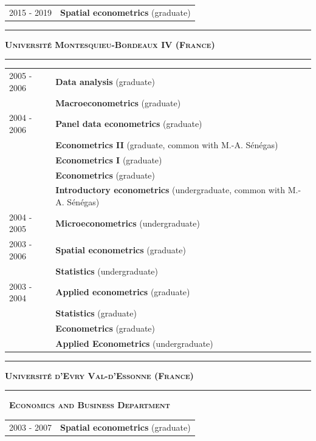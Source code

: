 \documentclass[a4paper,12pt]{article}
\newcommand{\titre}[1]{%
	\bigskip
	\noindent \rule[2mm]{\textwidth}{0.5pt}
	\textbf{\textsc{\large #1}} \\
	\noindent \rule[1mm]{\textwidth}{0.5pt}
	}
\newcommand{\smalltitre}[1]{%
	\noindent \textbullet~\textsc{\textbf{#1}}
	\smallskip
	}
\begin{document}
\noindent \begin{longtable}{@{}p{\annee}p{\texte}@{}}
2015 - 2019 & \textbf{Spatial econometrics} (graduate) \\
\end{longtable}


\titre{Université Montesquieu-Bordeaux IV (France)}

\noindent \begin{longtable}{@{}p{\annee}p{\texte}@{}}
2005 - 2006 & \textbf{Data analysis} (graduate) \\
		    & \textbf{Macroeconometrics} (graduate) \\
2004 - 2006 & \textbf{Panel data econometrics} (graduate) \\
		    & \textbf{Econometrics II} (graduate, common with M.-A. Sénégas) \\
		    & \textbf{Econometrics I} (graduate) \\
		    & \textbf{Econometrics} (graduate) \\
		    & \textbf{Introductory econometrics} (undergraduate, common with M.-A. Sénégas) \\
2004 - 2005 & \textbf{Microeconometrics} (undergraduate) \\
2003 - 2006 & \textbf{Spatial econometrics} (graduate) \\
		    & \textbf{Statistics} (undergraduate) \\
2003 - 2004 & \textbf{Applied econometrics} (graduate) \\
		    & \textbf{Statistics} (graduate) \\
		    & \textbf{Econometrics} (graduate) \\
		    & \textbf{Applied Econometrics} (undergraduate) \\
\end{longtable}


\titre{Université d'Evry Val-d'Essonne (France)}

\smalltitre{Economics and Business Department}

\noindent \begin{longtable}{@{}p{\annee}p{\texte}@{}}
2003 - 2007 & \textbf{Spatial econometrics} (graduate) \\
\end{longtable}

\newpage

\end{document}
